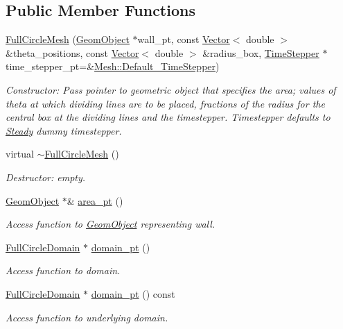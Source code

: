 \subsection*{Public Member Functions}
\begin{DoxyCompactItemize}
\item 
\hyperlink{classoomph_1_1FullCircleMesh_acf4dee3c3072751597d7897176b1e7f1}{Full\+Circle\+Mesh} (\hyperlink{classoomph_1_1GeomObject}{Geom\+Object} $\ast$wall\+\_\+pt, const \hyperlink{classoomph_1_1Vector}{Vector}$<$ double $>$ \&theta\+\_\+positions, const \hyperlink{classoomph_1_1Vector}{Vector}$<$ double $>$ \&radius\+\_\+box, \hyperlink{classoomph_1_1TimeStepper}{Time\+Stepper} $\ast$time\+\_\+stepper\+\_\+pt=\&\hyperlink{classoomph_1_1Mesh_a12243d0fee2b1fcee729ee5a4777ea10}{Mesh\+::\+Default\+\_\+\+Time\+Stepper})
\begin{DoxyCompactList}\small\item\em Constructor\+: Pass pointer to geometric object that specifies the area; values of theta at which dividing lines are to be placed, fractions of the radius for the central box at the dividing lines and the timestepper. Timestepper defaults to \hyperlink{classoomph_1_1Steady}{Steady} dummy timestepper. \end{DoxyCompactList}\item 
virtual \hyperlink{classoomph_1_1FullCircleMesh_a7acf128e8eeaefcd79b5b3cd5e9cbaa9}{$\sim$\+Full\+Circle\+Mesh} ()
\begin{DoxyCompactList}\small\item\em Destructor\+: empty. \end{DoxyCompactList}\item 
\hyperlink{classoomph_1_1GeomObject}{Geom\+Object} $\ast$\& \hyperlink{classoomph_1_1FullCircleMesh_a0ee479af0a6562231d7a7d1c5533beb9}{area\+\_\+pt} ()
\begin{DoxyCompactList}\small\item\em Access function to \hyperlink{classoomph_1_1GeomObject}{Geom\+Object} representing wall. \end{DoxyCompactList}\item 
\hyperlink{classoomph_1_1FullCircleDomain}{Full\+Circle\+Domain} $\ast$ \hyperlink{classoomph_1_1FullCircleMesh_aade9e5e2a9d65f8b7f5d041da4536d99}{domain\+\_\+pt} ()
\begin{DoxyCompactList}\small\item\em Access function to domain. \end{DoxyCompactList}\item 
\hyperlink{classoomph_1_1FullCircleDomain}{Full\+Circle\+Domain} $\ast$ \hyperlink{classoomph_1_1FullCircleMesh_ae912045c32ae004812d61a58161e531f}{domain\+\_\+pt} () const
\begin{DoxyCompactList}\small\item\em Access function to underlying domain. \end{DoxyCompactList}\end{DoxyCompactItemize}
